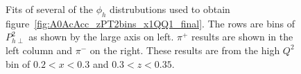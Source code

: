 %
\begin{figure}[htp]
\centering
\vspace{-1.5cm}
\caption{Fits of several of the $\phi_h$ distrubutions used to obtain figure~\ref{fig:A0AcAcc_zPT2bins_x1QQ1_final}. The rows are bins of $P_{h\perp}^2$ as shown by the large axis on left. $\pi^+$ results are shown in the left column and $\pi^-$ on the right. These results are from the high $Q^2$ bin of $0.2 < x < 0.3$ and $0.3 < z < 0.35$.}
\label{fig:phihFits_PT2bins_x1QQ1z6_final}
\end{figure}
%
\clearpage

